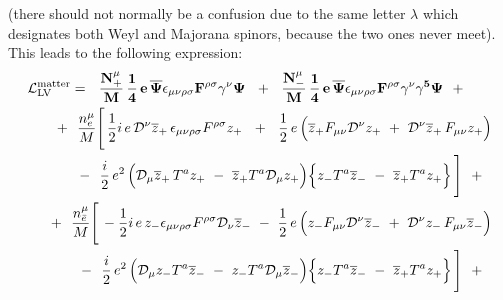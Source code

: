 \documentclass[a4paper,12pt]{article}
\newcommand{\slashed}[1]{\hbox{{$#1$}\llap{$/$}}}
\begin{document}
	(there should not normally be a confusion due to the
	same letter $ \lambda $ which designates both Weyl
	and Majorana spinors, because the two ones never meet).
	This leads to the following expression:
\begin{eqnarray}
\nonumber
\lefteqn{
     \mathcal{L}_{\mathrm{LV}}^{\mathrm{matter}}  = 
	~~      %
\mathbf{
	\frac{N_+^\mu}{M}\,
	\frac{1}{4} \,e\,
	\overline{\Psi} \epsilon_{\mu\nu\rho\sigma}
	F^{\rho\sigma} \gamma^\nu \Psi 
     }
	~~+~~
\mathbf{
	\frac{N_-^\mu}{M}\,
	\frac{1}{4} \,e\,
	\overline{\Psi} \epsilon_{\mu\nu\rho\sigma}
	F^{\rho\sigma} \gamma^\nu \gamma^5 \Psi 
     }
	~~+~~ 
	}\\
\nonumber
&&
	~~+~~
	\frac{n_e^\mu}{M}
	\Bigg[\,
		\frac{1}{2}i \,e \, 
		\mathcal{D}^\nu \overline{z}_+ \,
		\epsilon_{\mu\nu\rho\sigma}F^{\rho\sigma} z_+ 
		~~+~~
		\frac{1}{2}\, e\,
		\Big(
		  \overline{z}_+ F_{\mu\nu}
		  \mathcal{D}^\nu z_+ 
		  ~+~
		  \mathcal{D}^\nu \overline{z}_+ \,
		  F_{\mu\nu} z_+
		\Big) 
		\\
\nonumber
&&
               \qquad
		~~-~~
		\frac{i}{2}\, e^2\,
		\Big(
		  \mathcal{D}_\mu \overline{z}_+ \,
		  T^a z_+ 
		  ~-~
		  \overline{z}_+ T^a \mathcal{D}_\mu z_+
		\Big)
		\Big\{
		  z_- T^a \overline{z}_- 
		  ~-~
		  \overline{z}_+ T^a z_+
		\Big\}
	\,\Bigg] ~~+~~ \\
\nonumber
&&
	~~+~~
	\frac{n_{\bar{e}}^\mu}{M}
	\Bigg[\,
		- \frac{1}{2} i\, e\,
		z_- \epsilon_{\mu\nu\rho\sigma}F^{\rho\sigma}
		\mathcal{D}_\nu \overline{z}_- 
		~-~
		\frac{1}{2}\, e\,
		\Big(
		  z_- F_{\mu\nu}\mathcal{D}^\nu \overline{z}_- 
		  ~+~
		  \mathcal{D}^\nu z_- \,
		  F_{\mu\nu} \overline{z}_- 
		\Big)
		\\
\nonumber
&&
               \qquad
		~~-~~ 
		\frac{i}{2}\, e^2\,
		\Big(
		  \mathcal{D}_\mu z_- T^a \overline{z}_-
		  ~-~
		  z_- T^a \mathcal{D}_\mu \overline{z}_-
		\Big)
		\Big\{
		  z_- T^a \overline{z}_- 
		  ~-~
		  \overline{z}_+ T^a z_+
		\Big\}
	\,\Bigg]
	~~+~~ \\

\end{eqnarray}
\end{document}
